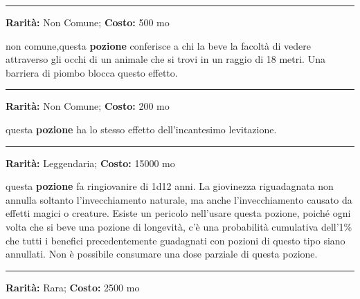\begin{multicols}{2}
\smallskip\noindent\rule{\linewidth}{2pt}  \hypertarget{PozionedellaChiaroveggenzaanimale}{}\medskip{}\noindent\label{PozionedellaChiaroveggenzaanimale}

\textbf{Rarità:} Non Comune; \textbf{Costo:} 500 mo

non comune,questa \textbf{pozione} conferisce a chi la beve la facoltà di vedere attraverso gli occhi di un animale che si trovi in un raggio di 18 metri. Una barriera di piombo blocca questo effetto.

\smallskip\noindent\rule{\linewidth}{2pt}  \hypertarget{PozionedellaLevitazione}{}\medskip{}\noindent\label{PozionedellaLevitazione}

\textbf{Rarità:} Non Comune; \textbf{Costo:} 200 mo

questa \textbf{pozione} ha lo stesso effetto dell'incantesimo levitazione.

\smallskip\noindent\rule{\linewidth}{2pt}  \hypertarget{PozionedellaLongevità}{}\medskip{}\noindent\label{PozionedellaLongevità}

\textbf{Rarità:} Leggendaria; \textbf{Costo:} 15000 mo

questa \textbf{pozione} fa ringiovanire di 1d12 anni. La giovinezza riguadagnata non annulla soltanto l'invecchiamento naturale, ma anche l'invecchiamento causato da effetti magici o creature. Esiste un pericolo nell'usare questa pozione, poiché ogni volta che si beve una pozione di longevità, c'è una probabilità cumulativa dell'1\% che tutti i benefici precedentemente guadagnati con pozioni di questo tipo siano annullati. Non è possibile consumare una dose parziale di questa pozione.

\smallskip\noindent\rule{\linewidth}{2pt}  \hypertarget{PozionedellaMetamorfosi}{}\medskip{}\noindent\label{PozionedellaMetamorfosi}

\textbf{Rarità:} Rara; \textbf{Costo:} 2500 mo


\end{multicols}

